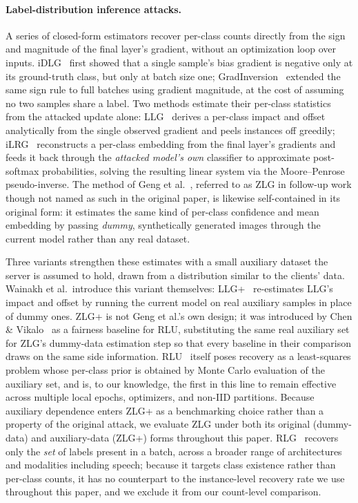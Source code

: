 \paragraph{Label-distribution inference attacks.}
A series of closed-form estimators recover per-class counts directly from
the sign and magnitude of the final layer's gradient, without an
optimization loop over inputs. iDLG~\cite{zhao2020idlg} first showed that a
single sample's bias gradient is negative only at its ground-truth class,
but only at batch size one; GradInversion~\cite{yin2021gradinversion}
extended the same sign rule to full batches using gradient magnitude, at
the cost of assuming no two samples share a label. Two methods estimate
their per-class statistics from the attacked update alone: LLG~\cite{wainakh2022llg}
derives a per-class impact and offset analytically from the single observed
gradient and peels instances off greedily; iLRG~\cite{ma2023ilrg} reconstructs
a per-class embedding from the final layer's gradients and feeds it back
through the \emph{attacked model's own} classifier to approximate
post-softmax probabilities, solving the resulting linear system via the
Moore--Penrose pseudo-inverse. The method of Geng et al.~\cite{geng2022zlg},
referred to as ZLG in follow-up work though not named as such in the
original paper, is likewise self-contained in its original form: it
estimates the same kind of per-class confidence and mean embedding by
passing \emph{dummy}, synthetically generated images through the current
model rather than any real dataset.

Three variants strengthen these estimates with a small auxiliary dataset
the server is assumed to hold, drawn from a distribution similar to the
clients' data. Wainakh et al.\ introduce this variant themselves: LLG+~\cite{wainakh2022llg}
re-estimates LLG's impact and offset by running the current model on real
auxiliary samples in place of dummy ones. ZLG+ is not Geng et al.'s own
design; it was introduced by Chen \& Vikalo~\cite{chen2024rlu} as a fairness
baseline for RLU, substituting the same real auxiliary set for ZLG's
dummy-data estimation step so that every baseline in their comparison draws
on the same side information. RLU~\cite{chen2024rlu} itself poses recovery
as a least-squares problem whose per-class prior is obtained by Monte Carlo
evaluation of the auxiliary set, and is, to our knowledge, the first in
this line to remain effective across multiple local epochs, optimizers, and
non-IID partitions. Because auxiliary dependence enters ZLG+ as a
benchmarking choice rather than a property of the original attack, we
evaluate ZLG under both its original (dummy-data) and auxiliary-data
(ZLG+) forms throughout this paper. RLG~\cite{dang2021rlg} recovers only the
\emph{set} of labels present in a batch, across a broader range of
architectures and modalities including speech; because it targets class
existence rather than per-class counts, it has no counterpart to the
instance-level recovery rate we use throughout this paper, and we exclude
it from our count-level comparison.

